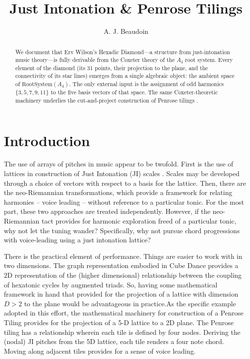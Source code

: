 \documentclass[11pt]{article}
\title{Just Intonation \& Penrose Tilings}
\author{A. J. Beaudoin}
\date{}
\begin{document}
\maketitle

\begin{abstract}
We document that Erv Wilson's Hexadic Diamond---a structure from just-intonation
music theory---is fully derivable from the Coxeter theory of the $A_4$ root
system. Every element of the diamond (its 31 points, their projection to the
plane, and the connectivity of its star lines) emerges from a single algebraic
object: the ambient space of $\mathrm{RootSystem}(A_4)$. The only external
input is the assignment of odd harmonics $\{3,5,7,9,11\}$ to the five basis
vectors of that space. The same Coxeter-theoretic machinery underlies the
cut-and-project construction of Penrose tilings \cite{senechal1995,boyleSteinhardt2022}.
\end{abstract}

\section{Introduction}

The use of arrays of pitches in music appear to be twofold.  First is the use of lattices in construction of Just Intonation (JI) scales \cite{Benson}. Scales may be developed through a choice of vectors with respect to a basis for the lattice. Then, there are the neo-Riemannian transformations, which provide a framework for relating harmonies -- voice leading -- without reference to a particular tonic.   For the most part, these two approaches are treated independently. However, if the neo-Riemannian tact provides for harmonic exploration freed of a particular tonic, why not let the tuning wander?  Specifically, why not pursue chord progressions with voice-leading using a just intonation lattice?

There is the practical element of performance.  Things are easier to work with in two dimensions.  The graph representation embodied in Cube Dance provides a 2D representation of the (higher dimensional) relationship between the coupling of hexatonic cycles by augmented triads. So, having some mathematical framework in hand that provided for the projection of a lattice with dimension $D > 2$ to the plane would be advantageous in practice.As the specific example adopted in this effort, the mathematical machinery for construction of a Penrose Tiling provides for the projection of a 5-D lattice to a 2D plane.  The Penrose tiling has a relationship wherein each tile is defined by four nodes. Deriving the (nodal) JI pitches from the 5D lattice, each tile renders a four note chord. Moving along adjacent tiles provides for a sense of voice leading.
\end{document}
